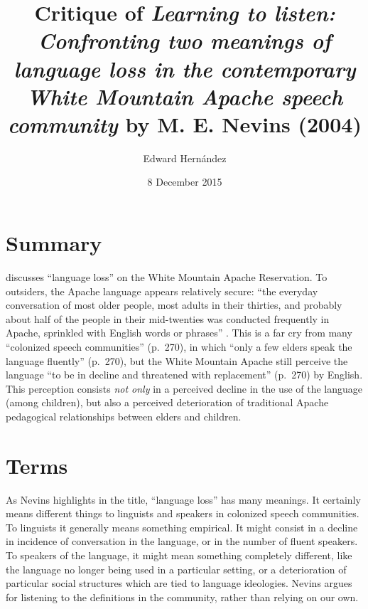 \documentclass[man,12pt,natbib]{apa6}
\begin{document}
\title{Critique of \emph{Learning to listen: Confronting two meanings of
language loss in the contemporary White Mountain Apache speech community} by M.
E. Nevins (2004)}
\author{Edward Hern\'{a}ndez}
\date{8 December 2015}
\maketitle


\section{Summary}

\citet{Nevins04} discusses ``language loss'' on the White Mountain Apache
Reservation. To outsiders, the Apache language appears relatively secure: ``the
everyday conversation of most older people, most adults in their thirties, and
probably about half of the people in their mid-twenties was conducted
frequently in Apache, sprinkled with English words or phrases''
\citep[p.~270]{Nevins04}. This is a far cry from many ``colonized speech
communities'' (p.~270), in which ``only a few elders speak the language
fluently'' (p.~270), but the White Mountain Apache still perceive the language
``to be in decline and threatened with replacement'' (p.~270) by English. This
perception consists \emph{not only} in a perceived decline in the use of the
language (among children), but also a perceived deterioration of traditional
Apache pedagogical relationships between elders and children.


\section{Terms}

As Nevins highlights in the title, ``language loss'' has many meanings. It
certainly means different things to linguists and speakers in colonized speech
communities.  To linguists it generally means something empirical. It might
consist in a decline in incidence of conversation in the language, or in the
number of fluent speakers. To speakers of the language, it might mean something
completely different, like the language no longer being used in a particular
setting, or a deterioration of particular social structures which are tied to
language ideologies. Nevins argues for listening to the definitions in the
community, rather than relying on our own.
\end{document}
